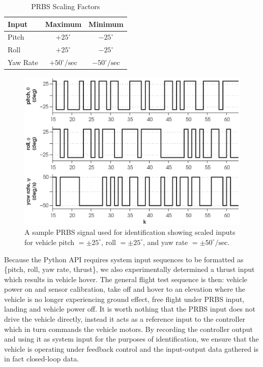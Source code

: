 \begin{table}[!htb]
\centering
\caption{PRBS Scaling Factors}\vspace{1em}
\begin{tabular}{lcc}
\toprule
Input & Maximum & Minimum\\
\midrule
Pitch & $+25^\circ$ & $-25^\circ$\\
Roll & $+25^\circ$ & $-25^\circ$\\
Yaw Rate & $+50^\circ/\mbox{sec}$ & $-50^\circ/\mbox{sec}$\\
\bottomrule
\end{tabular}
\end{table}

\begin{figure}[htb!]
	\centering
	\includegraphics{../fig/test_prbs.eps}
	\caption[A sample PRBS signal used for identification showing scaled inputs for vehicle pitch, roll, and yaw rate.]{A sample PRBS signal used for identification showing scaled inputs for vehicle pitch $= \pm 25^\circ$, roll $= \pm 25^\circ$, and yaw rate $= \pm 50^\circ/\mbox{sec}$.}
\end{figure}

Because the Python API requires system input sequences to be formatted as \{pitch, roll, yaw rate, thrust\}, we also experimentally determined a thrust input which results in vehicle hover. The general flight test sequence is then: vehicle power on and sensor calibration, take off and hover to an elevation where the vehicle is no longer experiencing ground effect, free flight under PRBS input, landing and vehicle power off. It is worth nothing that the PRBS input does not drive the vehicle directly, instead it acts as a reference input to the controller which in turn commands the vehicle motors. By recording the controller output and using it as system input for the purposes of identification, we ensure that the vehicle is operating under feedback control and the input-output data gathered is in fact closed-loop data.

